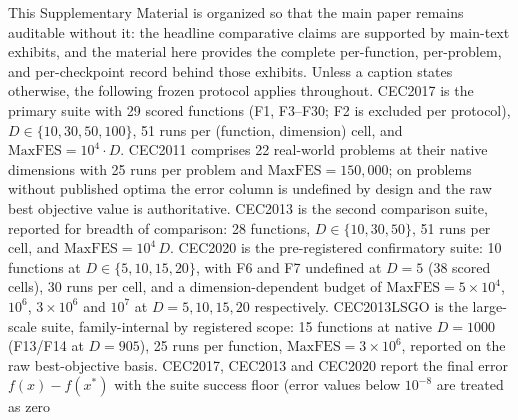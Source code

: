 \documentclass[algorithms,article,submit,moreauthors,pdftex]{Definitions/mdpi}
\begin{document}
\renewcommand{\thesection}{S\arabic{section}}
\renewcommand{\thesubsection}{S\arabic{section}.\arabic{subsection}}
\renewcommand{\thetable}{A\arabic{table}}
\renewcommand{\thefigure}{B\arabic{figure}}
\setcounter{section}{0}

\noindent This Supplementary Material is organized so that the main paper
remains auditable without it: the headline comparative claims are supported
by main-text exhibits, and the material here provides the complete
per-function, per-problem, and per-checkpoint record behind those
exhibits.  Unless a caption states otherwise, the following frozen
protocol applies throughout.
CEC2017 is the primary suite with 29 scored functions (F1, F3--F30; F2 is
excluded per protocol), $D \in \{10, 30, 50, 100\}$, 51 runs per
(function, dimension) cell, and $\mathrm{MaxFES} = 10^{4} \cdot D$.
CEC2011 comprises 22 real-world problems at their native dimensions with
25 runs per problem and $\mathrm{MaxFES} = 150{,}000$; on problems without
published optima the error column is undefined by design and the raw best
objective value is authoritative.
CEC2013 is the second comparison suite, reported for breadth of
comparison: 28 functions, $D \in \{10, 30, 50\}$, 51 runs per
cell, and $\mathrm{MaxFES} = 10^{4}\,D$.
CEC2020 is the pre-registered confirmatory suite: 10 functions at
$D \in \{5, 10, 15, 20\}$, with F6 and F7 undefined at $D = 5$ (38 scored
cells), 30 runs per cell, and a dimension-dependent budget of
$\mathrm{MaxFES} = 5 \times 10^{4}$, $10^{6}$, $3 \times 10^{6}$ and
$10^{7}$ at $D = 5, 10, 15, 20$ respectively.
CEC2013LSGO is the large-scale suite, family-internal by registered scope:
15 functions at native $D = 1000$ (F13/F14 at $D = 905$), 25 runs per
function, $\mathrm{MaxFES} = 3 \times 10^{6}$, reported on the raw
best-objective basis.
CEC2017, CEC2013 and CEC2020 report the final error $f(x) - f(x^{*})$ with
the suite success floor (error values below $10^{-8}$ are treated as zero
\end{document}
